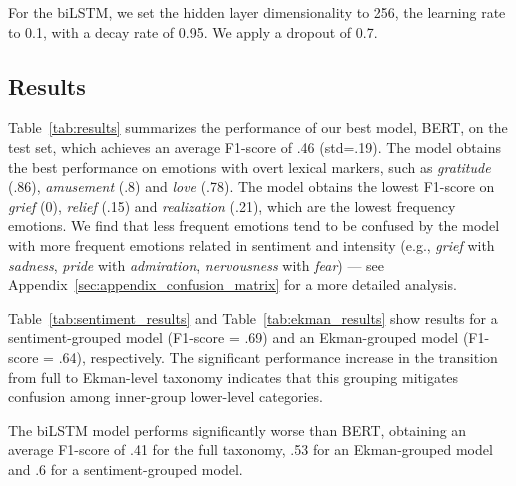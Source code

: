 \documentclass[11pt,a4paper]{article}
\begin{document}
For the biLSTM, we set the hidden layer dimensionality to 256, the learning rate to 0.1, with a decay rate of 0.95. We apply a dropout of 0.7.

\subsection{Results}

Table~\ref{tab:results} summarizes the performance of our best model, BERT, on the test set, which achieves an average F1-score of .46 (std=.19). The model obtains the best performance on emotions with overt lexical markers, such as \emph{gratitude} (.86), \emph{amusement} (.8) and \emph{love} (.78). The model obtains the lowest F1-score on \emph{grief} (0), \emph{relief} (.15) and \emph{realization} (.21), which are the lowest frequency emotions. We find that less frequent emotions tend to be confused by the model with more frequent emotions related in sentiment and intensity (e.g., \emph{grief} with \emph{sadness}, \emph{pride} with \emph{admiration}, \emph{nervousness} with \emph{fear}) --- see Appendix~\ref{sec:appendix_confusion_matrix} for a more detailed analysis.

Table~\ref{tab:sentiment_results} and Table~\ref{tab:ekman_results} show results for a sentiment-grouped model (F1-score = .69) and an Ekman-grouped model (F1-score = .64), respectively.
The significant performance increase in the transition from full to Ekman-level taxonomy indicates that this grouping mitigates confusion among inner-group lower-level categories.

The biLSTM model performs significantly worse than BERT, obtaining an average F1-score of .41 for the full taxonomy, .53 for an Ekman-grouped model and .6 for a sentiment-grouped model.
\end{document}
